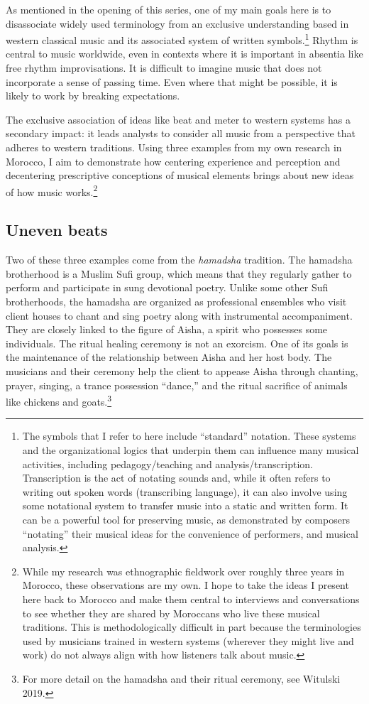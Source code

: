 \documentclass[twoside]{article}
\begin{document}
As mentioned in the opening of this series, one of my main goals here is
to disassociate widely used terminology from an exclusive understanding
based in western classical music and its associated system of written
symbols.\footnote{The symbols that I refer to here include ``standard''
  notation. These systems and the organizational logics that underpin
  them can influence many musical activities, including
  pedagogy/teaching and analysis/transcription. Transcription is the act
  of notating sounds and, while it often refers to writing out spoken
  words (transcribing language), it can also involve using some
  notational system to transfer music into a static and written form. It
  can be a powerful tool for preserving music, as demonstrated by
  composers ``notating'' their musical ideas for the convenience of
  performers, and musical analysis.} Rhythm is central to music
worldwide, even in contexts where it is important in absentia like free
rhythm improvisations. It is difficult to imagine music that does not
incorporate a sense of passing time. Even where that might be possible,
it is likely to work by breaking expectations.

The exclusive association of ideas like beat and meter to western
systems has a secondary impact: it leads analysts to consider all music
from a perspective that adheres to western traditions. Using three
examples from my own research in Morocco, I aim to demonstrate how
centering experience and perception and decentering prescriptive
conceptions of musical elements brings about new ideas of how music
works.\footnote{While my research was ethnographic fieldwork over
  roughly three years in Morocco, these observations are my own. I hope
  to take the ideas I present here back to Morocco and make them central
  to interviews and conversations to see whether they are shared by
  Moroccans who live these musical traditions. This is methodologically
  difficult in part because the terminologies used by musicians trained
  in western systems (wherever they might live and work) do not always
  align with how listeners talk about music.}

\hypertarget{uneven-beats}{%
\subsection{Uneven beats}\label{uneven-beats}}

Two of these three examples come from the \emph{hamadsha} tradition. The
hamadsha brotherhood is a Muslim Sufi group, which means that they
regularly gather to perform and participate in sung devotional poetry.
Unlike some other Sufi brotherhoods, the hamadsha are organized as
professional ensembles who visit client houses to chant and sing poetry
along with instrumental accompaniment. They are closely linked to the
figure of Aisha, a spirit who possesses some individuals. The ritual
healing ceremony is not an exorcism. One of its goals is the maintenance
of the relationship between Aisha and her host body. The musicians and
their ceremony help the client to appease Aisha through chanting,
prayer, singing, a trance possession ``dance,'' and the ritual sacrifice
of animals like chickens and goats.\footnote{For more detail on the
  hamadsha and their ritual ceremony, see Witulski 2019.}
\end{document}
